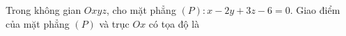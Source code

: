 \begin{ex}
Trong không gian $Oxyz$, cho mặt phẳng $(P)\colon x-2y+3z-6=0$. Giao điểm của mặt phẳng $(P)$ và trục $Ox$ có tọa độ là
\end{ex}
